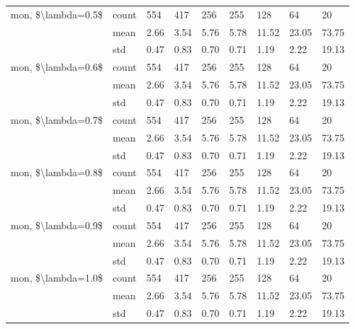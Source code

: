 \begin{tabular}{lllllllll}
mon, \$\textbackslash lambda=0.5\$ & count &   554 &   417 &    256 &    255 &    128 &     64 &     20 \\
                   & mean &  2.66 &  3.54 &   5.76 &   5.78 &  11.52 &  23.05 &  73.75 \\
                   & std &  0.47 &  0.83 &   0.70 &   0.71 &   1.19 &   2.22 &  19.13 \\
mon, \$\textbackslash lambda=0.6\$ & count &   554 &   417 &    256 &    255 &    128 &     64 &     20 \\
                   & mean &  2.66 &  3.54 &   5.76 &   5.78 &  11.52 &  23.05 &  73.75 \\
                   & std &  0.47 &  0.83 &   0.70 &   0.71 &   1.19 &   2.22 &  19.13 \\
mon, \$\textbackslash lambda=0.7\$ & count &   554 &   417 &    256 &    255 &    128 &     64 &     20 \\
                   & mean &  2.66 &  3.54 &   5.76 &   5.78 &  11.52 &  23.05 &  73.75 \\
                   & std &  0.47 &  0.83 &   0.70 &   0.71 &   1.19 &   2.22 &  19.13 \\
mon, \$\textbackslash lambda=0.8\$ & count &   554 &   417 &    256 &    255 &    128 &     64 &     20 \\
                   & mean &  2.66 &  3.54 &   5.76 &   5.78 &  11.52 &  23.05 &  73.75 \\
                   & std &  0.47 &  0.83 &   0.70 &   0.71 &   1.19 &   2.22 &  19.13 \\
mon, \$\textbackslash lambda=0.9\$ & count &   554 &   417 &    256 &    255 &    128 &     64 &     20 \\
                   & mean &  2.66 &  3.54 &   5.76 &   5.78 &  11.52 &  23.05 &  73.75 \\
                   & std &  0.47 &  0.83 &   0.70 &   0.71 &   1.19 &   2.22 &  19.13 \\
mon, \$\textbackslash lambda=1.0\$ & count &   554 &   417 &    256 &    255 &    128 &     64 &     20 \\
                   & mean &  2.66 &  3.54 &   5.76 &   5.78 &  11.52 &  23.05 &  73.75 \\
                   & std &  0.47 &  0.83 &   0.70 &   0.71 &   1.19 &   2.22 &  19.13 \\
\bottomrule
\end{tabular}
